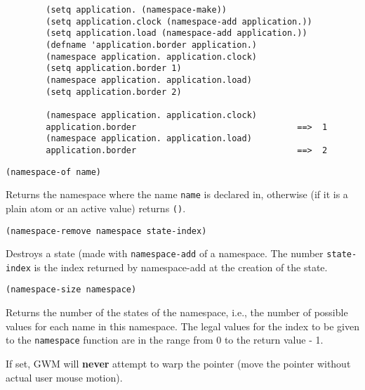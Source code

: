 {\exemplefont\begin{verbatim}
        (setq application. (namespace-make))
        (setq application.clock (namespace-add application.))
        (setq application.load (namespace-add application.))
        (defname 'application.border application.)
        (namespace application. application.clock)
        (setq application.border 1)
        (namespace application. application.load)
        (setq application.border 2)

        (namespace application. application.clock)
        application.border                                ==>  1
        (namespace application. application.load)
        application.border                                ==>  2
\end{verbatim}}


{\usagefont\begin{verbatim}
(namespace-of name)
\end{verbatim}}\usageupspace

Returns the namespace where the name \verb"name" is declared in, otherwise
(if it is a plain atom or an active value) returns \verb"()".


{\usagefont\begin{verbatim}
(namespace-remove namespace state-index)
\end{verbatim}}\usageupspace

Destroys a state (made with \verb"namespace-add" of a namespace. The number
\verb"state-index" is the index returned by namespace-add at the creation of
the state.


{\usagefont\begin{verbatim}
(namespace-size namespace)
\end{verbatim}}\usageupspace

Returns the number of the states of the namespace, i.e., the number of
possible values for each name in this namespace. The legal values for the
index to be given to the \verb"namespace" function are in the range
from 0 to the return value - 1.



If set, GWM will {\bf never} attempt to warp the pointer (move the pointer
without actual user mouse motion).

